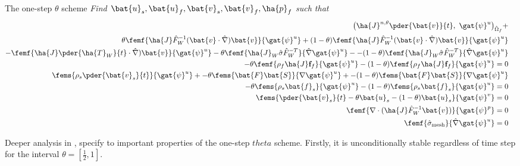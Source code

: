 \begin{prob}
The one-step $\theta$ scheme 
\textit{Find $\bat{u}_s, \bat{u}_f, \bat{v}_s, \bat{v}_f, \ha{p}_f $ such that}
\begin{align*}
\big(\ha{J}^{n, \theta} \pder{\bat{v}}{t}, \ \gat{\psi}^u \big)_{\hat{\Omega}_f} + \\
\theta \femf{\ha{J} \hat{F}_W^{-1}(\bat{v} \cdot \hat{\nabla}) \bat{v}}
{\gat{\psi}^u} + 
(1 - \theta) \femf{\ha{J} \hat{F}_W^{-1}(\bat{v} \cdot \hat{\nabla}) \bat{v}}
{\gat{\psi}^u} \\
- \femf{\ha{J}  \pder{\ha{T}_W}{t} \cdot \hat{\nabla}) \bat{v}}
{\gat{\psi}^u}
-\theta \femf{\ha{J}_W \hat{\sigma}\hat{F}_W^{-T}}{\hat{\nabla}\gat{\psi}^u} -
- (1 - \theta) \femf{\ha{J}_W \hat{\sigma}\hat{F}_W^{-T}}{\hat{\nabla}\gat{\psi}^u} \\
- \theta \femf{\rho_f \ha{J} \mathbf{f}_f}{{\gat{\psi}^u}} - 
(1 - \theta) \femf{\rho_f \ha{J} \mathbf{f}_f}{{\gat{\psi}^u}}= 0& \\
\fems{\rho_s \pder{\bat{v}_s}{t}}{\gat{\psi}^u} + 
- \theta\fems{\bat{F}\bat{S}}{\nabla \gat{\psi}^u}  + 
- (1 - \theta) \fems{\bat{F}\bat{S}}{\nabla \gat{\psi}^u} \\
- \theta \fems{\rho_s \bat{f}_s}{\gat{\psi}^u} 
- (1 - \theta) \fems{\rho_s \bat{f}_s}{\gat{\psi}^u} = 0 \\
\fems{\pder{\bat{v}_s}{t} - \theta \bat{u}_s - (1 - \theta)\bat{u}_s}{\gat{\psi}^v}  = 0&\\
\femf{\nabla \cdot (\ha{J} \hat{F}_W^{-1} \bat{v})}{\gat{\psi}^p} = 0& \\
\femf{\hat{\sigma}_{\text{mesh}}}{\hat{\nabla}\gat{\psi}^u} = 0&
\end{align*} 
\end{prob}

Deeper analysis in  \cite{Wicka}, specify to important properties of the one-step $theta$ scheme. Firstly, it is unconditionally stable regardless of time step for the interval $\theta = [\frac{1}{2}, 1]$. 

